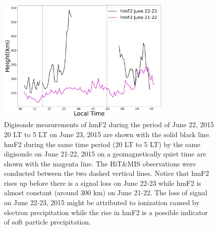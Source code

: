 
\begin{figure}
	\centering\includegraphics[width=20pc]{digi.pdf}
	\caption{ Digisonde measurements of hmF2 during the period of June 22, 2015 20 LT to 5 LT on June 23, 2015 are shown with the solid black line.
		hmF2 during the same time period (20 LT to 5 LT) by the same digisonde on June 21-22, 2015 on a geomagnetically quiet time are shown with the magenta line.
		The  HiT\&MIS observations were conducted between the two dashed vertical lines. Notice that hmF2 rises up before there is a signal loss on June 22-23 while hmF2 is almost constant (around 300 km) on June 21-22. The loss of signal on June 22-23, 2015 might be attributed to ionization caused by electron precipitation while the rise in hmF2 is a possible indicator of soft particle precipitation. 
	}
	\label{fig:digi}
\end{figure}

